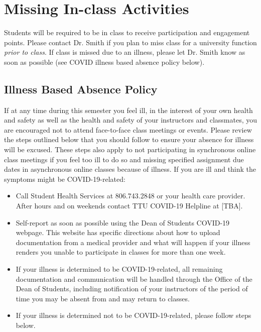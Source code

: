 \documentclass[12pt, notitlepage]{article}   	%
\begin{document}
{\section{Missing In-class Activities}
Students will be required to be in class to receive participation and engagement points. 
Please contact Dr. Smith if you plan to miss class for a university function 
\textit{prior to class}. If class is missed due to an illness, 
please let Dr. Smith know as soon as possible (see COVID illness based absence policy below).

\subsection{Illness Based Absence Policy}
If at any time during this semester you feel ill, in the interest of your own health and 
safety as well as the health and safety of your instructors and classmates, you are 
encouraged not to attend face-to-face class meetings or events.  Please review the steps 
outlined below that you should follow to ensure your absence for illness will be excused. 
These steps also apply to not participating in synchronous online class meetings if you feel 
too ill to do so and missing specified assignment due dates in asynchronous online classes 
because of illness. If you are ill and think the symptoms might be COVID-19-related:
\begin{itemize}
	\item{Call Student Health Services at 806.743.2848 or your health care provider.  
	After hours and on weekends contact TTU COVID-19 Helpline at [TBA].}
	\item{Self-report as soon as possible using the Dean of Students COVID-19 webpage.
	This website has specific directions about how to upload documentation from a medical 
	provider and what will happen if your illness renders you unable to participate in 
	classes for more than one week.}
	\item{If your illness is determined to be COVID-19-related, all remaining 
	documentation and communication will be handled through the Office of the 
	Dean of Students, including notification of your instructors of the period of 
	time you may be absent from and may return to classes.}
	\item{If your illness is determined not to be COVID-19-related, please follow steps below.}
\end{itemize}

}
\end{document}
